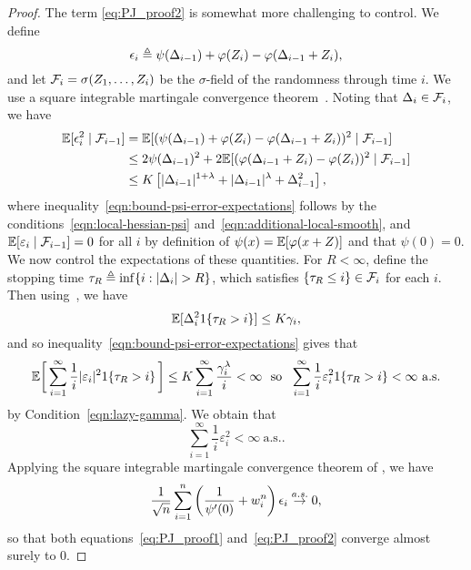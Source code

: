 \begin{proof}
  The term \eqref{eq:PJ_proof2} is somewhat more challenging to control.
  We define
  \begin{equation*}
    \epsilon_i \triangleq \psi(\Delta_{i-1}) + \varphi(Z_i)
    - \varphi(\Delta_{i-1}+Z_i),
  \end{equation*}
  and let
  $\mathcal{F}_i = \sigma(Z_1, \ldots, Z_i)$ be the $\sigma$-field of the randomness
  through time $i$. We use a square integrable martingale convergence
  theorem~\cite[Exercise~5.3.35]{Dembo16}. Noting that
  $\Delta_i \in \mathcal{F}_i$, we have
  \begin{align}
    \mathbb{E}[\epsilon_i^2 \mid \mathcal{F}_{i-1}]
    & = \mathbb{E}[(\psi(\Delta_{i-1}) + \varphi(Z_i)
      - \varphi(\Delta_{i-1} + Z_i))^2 \mid \mathcal{F}_{i-1}]
    \nonumber \\
    & \le 2 \psi(\Delta_{i-1})^2
    + 2 \mathbb{E}[(\varphi(\Delta_{i-1} + Z_i) - \varphi(Z_i))^2 \mid \mathcal{F}_{i-1}]
    \nonumber \\
    & \le
    K \left[|\Delta_{i-1}|^{1 + \lambda}
      + |\Delta_{i-1}|^\lambda
      + \Delta_{i-1}^2 \right],
    \label{eqn:bound-psi-error-expectations}
  \end{align}
  where inequality~\eqref{eqn:bound-psi-error-expectations} follows by the
  conditions~\eqref{eqn:local-hessian-psi}
  and~\eqref{eqn:additional-local-smooth}, and $\mathbb{E}[\varepsilon_i \mid
    \mathcal{F}_{i-1}] = 0$ for all $i$ by definition of $\psi(x) = \mathbb{E}[\varphi(x
    + Z)]$ and that $\psi(0) = 0$.  We now control the expectations of these
  quantities. For $R < \infty$, define the stopping time $\tau_R \triangleq \inf
  \{i : |\Delta_i| > R\}$, which satisfies $\{\tau_R \le i\} \in \mathcal{F}_i$
  for each $i$.  Then using~\cite[Eq.~(A14)]{PolyakJu92}, we have
  \begin{equation*}
    \mathbb{E}[\Delta_i^2 1\!\left\{\tau_R > i\right\}] \le K \gamma_i,
  \end{equation*}
  and so inequality~\eqref{eqn:bound-psi-error-expectations} gives that
  \begin{equation*}
    \mathbb{E}\bigg[\sum_{i = 1}^\infty \frac{1}{i}
      |\varepsilon_i|^2 1\!\left\{\tau_R > i\right\} \bigg]
    \le K \sum_{i = 1}^\infty \frac{\gamma_i^\lambda}{i}
    < \infty
    ~~ \mbox{so} ~~
    \sum_{i = 1}^\infty \frac{1}{i}
    \varepsilon_i^2 1\!\left\{\tau_R > i\right\} < \infty
    ~ \mbox{a.s.}
  \end{equation*}
  by Condition~\eqref{eqn:lazy-gamma}.  We obtain that 
  \begin{equation*}
    \sum_{i = 1}^\infty \frac{1}{i}
    \varepsilon_i^2  < \infty
    ~ \mbox{a.s.}.
  \end{equation*}
  Applying the square integrable martingale convergence
  theorem of \cite[Ex.~5.3.35]{Dembo16}, we have
  \begin{equation*}
    \frac{1}{\sqrt{n}} \sum_{i = 1}^n
    \left(\frac{1}{\psi'(0)} + w_i^n\right) \epsilon_i \stackrel{a.s.}{\rightarrow} 0,
  \end{equation*}
  so that both equations~\eqref{eq:PJ_proof1} and~\eqref{eq:PJ_proof2}
  converge almost surely to 0.
\end{proof}

